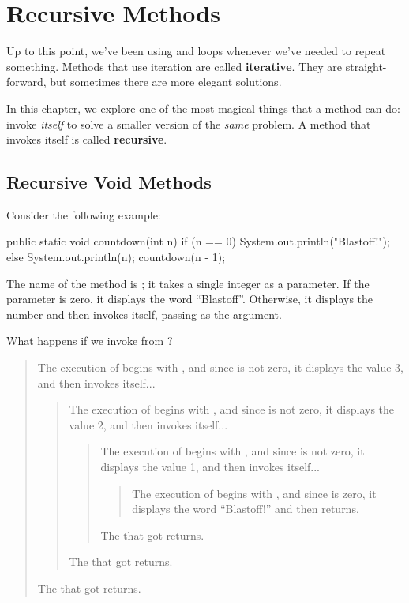 \chapter{Recursive Methods}


Up to this point, we've been using  and  loops whenever we've needed to repeat something.
Methods that use iteration are called {\bf iterative}.
They are straight-forward, but sometimes there are more elegant solutions.

In this chapter, we explore one of the most magical things that a method can do: invoke {\em itself} to solve a smaller version of the {\em same} problem.
A method that invokes itself is called {\bf recursive}.


\section{Recursive Void Methods}
\label{recursion}


Consider the following example:

\begin{code}
public static void countdown(int n) {
    if (n == 0) {
        System.out.println("Blastoff!");
    } else {
        System.out.println(n);
        countdown(n - 1);
    }
}
\end{code}

The name of the method is ; it takes a single integer as a parameter.
If the parameter is zero, it displays the word ``Blastoff''.
Otherwise, it displays the number and then invokes itself, passing  as the argument.

What happens if we invoke  from ?

\vspace{-1ex}
\begin{quote}
The execution of  begins with , and since  is not zero, it displays the value 3, and then invokes itself...
\begin{quote}
The execution of  begins with , and since  is not zero, it displays the value 2, and then invokes itself...
\begin{quote}
The execution of  begins with , and since  is not zero, it displays the value 1, and then invokes itself...
\begin{quote}
The execution of  begins with , and since  is zero, it displays the word ``Blastoff!'' and then returns.
\end{quote}
The  that got  returns.
\end{quote}
The  that got  returns.
\end{quote}
The  that got  returns.
\end{quote}
\vspace{-1ex}

